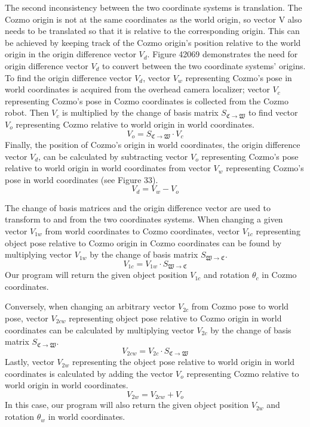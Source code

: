 \documentclass[jou,apacite]{apa6}
\begin{document}
The second inconsistency between the two coordinate systems is translation. The Cozmo origin is not at the same coordinates as the world origin, so vector V also needs to be translated so that it is relative to the corresponding origin. This can be achieved by keeping track of the Cozmo origin’s position relative to the world origin in the origin difference vector $V_d$. Figure 42069 demonstrates the need for origin difference vector $V_d$ to convert between the two coordinate systems’ origins. To find the origin difference vector $V_d$, vector $V_w$ representing Cozmo's pose in world coordinates is acquired from the overhead camera localizer; vector $V_c$ representing Cozmo’s pose in Cozmo coordinates is collected from the Cozmo robot. Then $V_c$ is multiplied by the change of basis matrix $S_{\mathfrak{C}\rightarrow\mathfrak{W}}$ to find vector $V_o$ representing Cozmo relative to world origin in world coordinates.
$$V_o = S_{\mathfrak{C}\rightarrow\mathfrak{W}} \cdot V_c$$
Finally, the position of Cozmo’s origin in world coordinates, the origin difference vector $V_d$, can be calculated by subtracting vector $V_o$ representing Cozmo’s pose relative to world origin in world coordinates from vector $V_w$ representing Cozmo’s pose in world coordinates (see Figure 33). 
$$V_d = V_w - V_o$$

The change of basis matrices and the origin difference vector are used to transform to and from the two coordinates systems. When changing a given vector $V_{1w}$ from world coordinates to Cozmo coordinates, vector $V_{1c}$ representing object pose relative to Cozmo origin in Cozmo coordinates can be found by multiplying vector $V_{1w}$ by the  change of basis matrix $S_{\mathfrak{W}\rightarrow\mathfrak{C}}$.
$$V_{1c} = V_{1w} \cdot S_{\mathfrak{W}\rightarrow\mathfrak{C}}$$
Our program will return the given object position $V_{1c}$ and rotation $\theta_c$ in Cozmo coordinates.

Conversely, when changing an arbitrary vector $V_{2c}$ from Cozmo pose to world pose, vector $V_{2cw}$ representing object pose relative to Cozmo origin in world coordinates can be calculated by multiplying vector $V_{2c}$ by the  change of basis matrix $S_{\mathfrak{C}\rightarrow\mathfrak{W}}$.
$$V_{2cw} = V_{2c} \cdot S_{\mathfrak{C}\rightarrow\mathfrak{W}}$$
Lastly, vector $V_{2w}$ representing the object pose relative to world origin in world coordinates is calculated by adding the vector $V_o$ representing Cozmo relative to world origin in world coordinates.
$$V_{2w} = V_{2cw} + V_o$$
In this case, our program will also return the given object position $V_{2w}$ and rotation $\theta_w$ in world coordinates.
\end{document}
